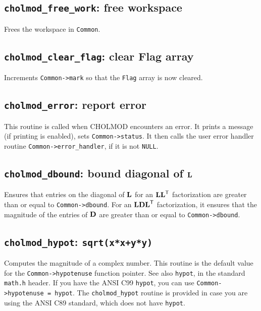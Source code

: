 \documentclass[11pt]{article}
\newcommand{\m}[1]{{\bf{#1}}}       %
\newcommand{\tr}{^{\sf T}}          %
\begin{document}
\subsection{{\tt cholmod\_free\_work}: free workspace}


Frees the workspace in {\tt Common}.

\subsection{{\tt cholmod\_clear\_flag}: clear Flag array}


Increments {\tt Common->mark} so that the {\tt Flag} array is now cleared.

\newpage \subsection{{\tt cholmod\_error}: report error}


This routine is called when CHOLMOD encounters an error.
It prints a message (if printing is enabled), sets
{\tt Common->status}.  It then calls the
user error handler routine {\tt Common->error\_handler},
if it is not {\tt NULL}.

\subsection{{\tt cholmod\_dbound}: bound diagonal of $\m{L}$}


Ensures that entries on the diagonal of $\m{L}$ for an $\m{LL}\tr$
factorization are greater than or equal to {\tt Common->dbound}.
For an $\m{LDL}\tr$ factorization, it ensures that the magnitude
of the entries of $\m{D}$ are greater than or equal to {\tt Common->dbound}.

\subsection{{\tt cholmod\_hypot}: {\tt sqrt(x*x+y*y)}}


Computes the magnitude of a complex number.
This routine is the default value for the {\tt Common->hypotenuse} function pointer.
See also {\tt hypot}, in the standard {\tt math.h} header.  If you have
the ANSI C99 {\tt hypot}, you can use {\tt Common->hypotenuse = hypot}.
The {\tt cholmod\_hypot} routine is provided in case you are using the
ANSI C89 standard, which does not have {\tt hypot}.
\end{document}
